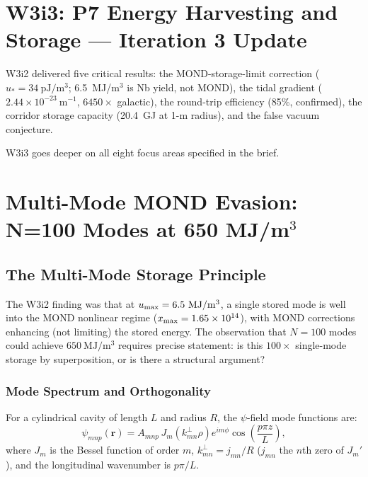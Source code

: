 \documentclass[aps,prd,twocolumn,superscriptaddress]{revtex4-2}
\begin{document}
\maketitle

\section*{W3i3: P7 Energy Harvesting and Storage --- Iteration 3 Update}
\label{sec:intro}

W3i2 delivered five critical results: the MOND-storage-limit correction
($u_* = 34~\mathrm{pJ/m^3}$; 6.5~MJ/m$^3$ is Nb yield, not MOND),
the tidal gradient ($2.44\times 10^{-23}~\mathrm{m^{-1}}$, $6450\times$
galactic), the round-trip efficiency (85\%, confirmed), the corridor
storage capacity (20.4~GJ at 1-m radius), and the false vacuum conjecture.

W3i3 goes deeper on all eight focus areas specified in the brief.

\section{Multi-Mode MOND Evasion: N=100 Modes at 650 MJ/m$^3$}
\label{sec:multimode}

\subsection{The Multi-Mode Storage Principle}

The W3i2 finding was that at $u_{\rm max} = 6.5~\mathrm{MJ/m^3}$, a
single stored mode is well into the MOND nonlinear regime ($x_{\rm max}
= 1.65\times 10^{14}$), with MOND corrections enhancing (not limiting)
the stored energy.  The observation that $N = 100$ modes could achieve
$650~\mathrm{MJ/m^3}$ requires precise statement: is this $100\times$
single-mode storage by superposition, or is there a structural argument?

\subsubsection{Mode Spectrum and Orthogonality}

For a cylindrical cavity of length $L$ and radius $R$, the
$\psi$-field mode functions are:
\begin{equation}
\psi_{mnp}(\mathbf{r}) = A_{mnp}\,J_m(k_{mn}^\perp \rho)
e^{im\phi}\cos\!\left(\frac{p\pi z}{L}\right),
\end{equation}
where $J_m$ is the Bessel function of order $m$,
$k_{mn}^\perp = j_{mn}/R$ ($j_{mn}$ the $n$th zero of $J_m'$),
and the longitudinal wavenumber is $p\pi/L$.
\end{document}
